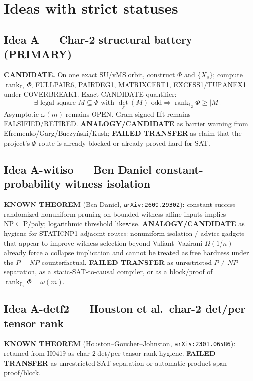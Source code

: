 \documentclass[11pt]{article}
\begin{document}
\section*{Ideas with strict statuses}
\subsection*{Idea A --- Char-2 structural battery (PRIMARY)}
\textbf{CANDIDATE.} On one exact SU/vMS orbit, construct $\Phi$ and $\{X_s\}$;
compute $\operatorname{rank}_{\mathbb F_2}\Phi$, FULLPAIR6, PAIRDEG1, MATRIXCERT1,
EXCESS1/TURANEX1 under COVERBREAK1. Exact CANDIDATE quantifier:
\[
\exists\text{ legal square }M\subseteq\Phi\text{ with }\det_{\mathbb Z}(M)\text{ odd}
\Rightarrow\operatorname{rank}_{\mathbb F_2}\Phi\ge|M|.
\]
Asymptotic $\omega(m)$ remains OPEN. Gram signed-lift remains FALSIFIED/RETIRED.
\textbf{ANALOGY/CANDIDATE} as barrier warning from Efremenko/Garg/Buczy\'nski/Kush;
\textbf{FAILED TRANSFER} as claim that the project's $\Phi$ route is already
blocked or already proved hard for SAT.

\subsection*{Idea A-witiso --- Ben Daniel constant-probability witness isolation}
\textbf{KNOWN THEOREM} (Ben Daniel, \texttt{arXiv:2609.29302}): constant-success
randomized nonuniform pruning on bounded-witness affine inputs implies
$\mathrm{NP}\subseteq\mathrm{P/poly}$; logarithmic threshold likewise.
\textbf{ANALOGY/CANDIDATE} as hygiene for STATICNP1-adjacent routes: nonuniform
isolation / advice gadgets that appear to improve witness selection beyond
Valiant--Vazirani $\Omega(1/n)$ already force a collapse implication and cannot
be treated as free hardness under the $P=NP$ counterfactual.
\textbf{FAILED TRANSFER} as unrestricted $P\neq NP$ separation, as a
static-SAT-to-causal compiler, or as a block/proof of
$\operatorname{rank}_{\mathbb F_2}\Phi=\omega(m)$.

\subsection*{Idea A-detf2 --- Houston et al.\ char-2 det/per tensor rank}
\textbf{KNOWN THEOREM} (Houston--Goucher--Johnston, \texttt{arXiv:2301.06586}):
retained from H0419 as char-$2$ det/per tensor-rank hygiene.
\textbf{FAILED TRANSFER} as unrestricted SAT separation or automatic
product-span proof/block.
\end{document}
